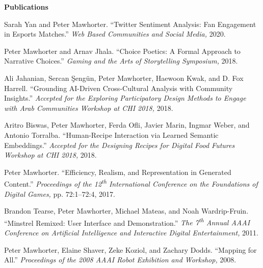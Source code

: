 \documentclass[11pt]{article}
\newenvironment{pubs}[1]{%
  \vspace{8pt}\textbf{\Large #1} \hrulefill\vspace{6pt}
  \begin{adjustwidth}{14pt}{0pt}
  \setlength{\parskip}{4pt}
  \setlength{\parindent}{-8pt}
}{%
  \end{adjustwidth}
}
\newcommand{\fullpub}[5]{%
\begin{samepage}
#1. ``#2.'' \textit{#3,} #4, #5.

\end{samepage}%
}
\newcommand{\nppub}[4]{%
\begin{samepage}
#1. ``#2.'' \textit{#3,} #4.

\end{samepage}%
}
\newcommand{\tsup}[1]{\textsuperscript{#1}}
\begin{document}
\begin{pubs}{Publications}
\nppub{Sarah Yan and Peter Mawhorter}{Twitter Sentiment Analysis: Fan Engagement in Esports Matches}{Web Based Communities and Social Media}{2020}

\nppub{Peter Mawhorter and Arnav Jhala}{Choice Poetics: A Formal Approach to Narrative Choices}{Gaming and the Arts of Storytelling Symposium}{2018}

\nppub{Ali Jahanian, Sercan Şengün, Peter Mawhorter, Haewoon Kwak, and D. Fox Harrell}{Grounding AI-Driven Cross-Cultural Analysis with Community Insights}{Accepted for the Exploring Participatory Design Methods to Engage with Arab Communities Workshop at CHI 2018}{2018}

\nppub{Aritro Biswas, Peter Mawhorter, Ferda Ofli, Javier Marin, Ingmar Weber, and Antonio Torralba}{Human-Recipe Interaction via Learned Semantic Embeddings}{Accepted for the Designing Recipes for Digital Food Futures Workshop at CHI 2018}{2018}

\fullpub{Peter Mawhorter}{Efficiency, Realism, and Representation in Generated Content}{Proceedings of the 12\tsup{th} International Conference on the Foundations of Digital Games}{pp. 72:1--72:4}{2017}

\nppub{Brandon Tearse, Peter Mawhorter, Michael Mateas, and Noah Wardrip-Fruin}{Minstrel Remixed: User Interface and Demonstration}{The 7\tsup{th} Annual AAAI Conference on Artificial Intelligence and Interactive Digital Entertainment}{2011}

\nppub{Peter Mawhorter, Elaine Shaver, Zeke Koziol, and Zachary Dodds}{Mapping for All}{Proceedings of the 2008 AAAI Robot Exhibition and Workshop}{2008}

\end{pubs}

\newpage
\end{document}

